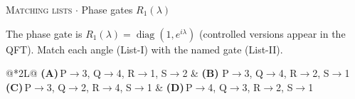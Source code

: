 \documentclass[11pt,a4paper]{article}
\newcommand{\optlabel}[1]{\textbf{(#1)}}
\newcommand{\correctlabel}[1]{\textcolor{okgreen}{\textbf{(#1)}\,\ding{51}}}
\newenvironment{qitem}[1]{\begin{list}{}{\setlength{\leftmargin}{3.3em}\setlength{\labelwidth}{3.1em}%
  \setlength{\labelsep}{0.2em}\setlength{\topsep}{3pt}\setlength{\parsep}{3pt}}\item[\textbf{Q.#1}\hfill]}{\end{list}}
\newcommand{\qmeta}[2]{{\footnotesize\color{black!60}\textsc{#1} \;$\cdot$\; #2}\par}
\begin{document}
\begin{qitem}{36}
\qmeta{Matching lists}{Phase gates $R_1(\lambda)$}
The phase gate is $R_1(\lambda) = \operatorname{diag}(1, e^{i\lambda})$ (controlled versions appear in the QFT). Match each angle (List-I) with the named gate (List-II).
\par\smallskip{}
\par\smallskip\noindent\begin{tabularx}{\linewidth}{@{}*{2}{L}@{}}
\optlabel{A}\,P$\to$3, Q$\to$4, R$\to$1, S$\to$2 & \correctlabel{B}\,P$\to$3, Q$\to$4, R$\to$2, S$\to$1 \\[3pt]
\optlabel{C}\,P$\to$3, Q$\to$2, R$\to$4, S$\to$1 & \optlabel{D}\,P$\to$4, Q$\to$3, R$\to$2, S$\to$1
\end{tabularx}
\end{qitem}
\end{document}
